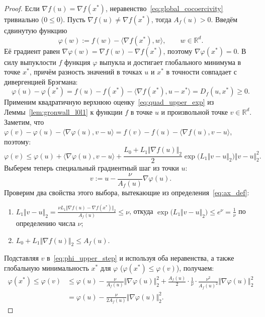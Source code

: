 \documentclass[11pt, a4paper]{article}
\theoremstyle{definition}
\begin{document}
\begin{proof}
Если $\nabla f(u) = \nabla f(x^*)$, неравенство~\eqref{eq:global_cocoercivity} тривиально ($0 \le 0$). Пусть $\nabla f(u) \neq \nabla f(x^*)$, тогда $A_f(u) > 0$. Введём сдвинутую функцию
\[
\varphi(w) := f(w) - \langle \nabla f(x^*), w \rangle, \qquad w \in \mathbb{R}^d.
\]
Её градиент равен $\nabla \varphi(w) = \nabla f(w) - \nabla f(x^*)$, поэтому $\nabla \varphi(x^*) = 0$. В силу выпуклости $f$ функция $\varphi$ выпукла и достигает глобального минимума в точке $x^*$, причём разность значений в точках $u$ и $x^*$ в точности совпадает с дивергенцией Брэгмана:
\[
\varphi(u) - \varphi(x^*) = f(u) - f(x^*) - \langle \nabla f(x^*), u - x^* \rangle = D_f(u, x^*) \ge 0.
\]
Применим квадратичную верхнюю оценку~\eqref{eq:quad_upper_exp} из Леммы~\ref{lem:gronwall_l0l1} к функции $f$ в точке $u$ и произвольной точке $v \in \mathbb{R}^d$. Заметим, что $\varphi(v) - \varphi(u) - \langle \nabla \varphi(u), v - u \rangle = f(v) - f(u) - \langle \nabla f(u), v - u \rangle$, поэтому:
\begin{equation}\label{eq:phi_upper_step}
\varphi(v) \le \varphi(u) + \langle \nabla \varphi(u), v - u \rangle + \frac{L_0 + L_1 \Vert \nabla f(u) \Vert_2}{2} \exp\big(L_1 \Vert v - u \Vert_2\big) \Vert v - u \Vert_2^2.
\end{equation}
Выберем теперь специальный градиентный шаг из точки $u$:
\[
v := u - \frac{\nu}{A_f(u)} \nabla \varphi(u).
\]
Проверим два свойства этого выбора, вытекающие из определения~\eqref{eq:ax_def}:
\begin{enumerate}
    \item $L_1 \Vert v - u \Vert_2 = \frac{\nu L_1 \Vert \nabla f(u) - \nabla f(x^*) \Vert_2}{A_f(u)} \le \nu$, откуда $\exp\big(L_1 \Vert v - u \Vert_2\big) \le e^\nu = \frac{1}{\nu}$ по определению числа $\nu$;
    \item $L_0 + L_1 \Vert \nabla f(u) \Vert_2 \le A_f(u)$.
\end{enumerate}
Подставляя $v$ в~\eqref{eq:phi_upper_step} и используя оба неравенства, а также глобальную минимальность $x^*$ для $\varphi$ ($\varphi(x^*) \le \varphi(v)$), получаем:
\begin{align*}
\varphi(x^*) \le \varphi(v) &\le \varphi(u) - \frac{\nu}{A_f(u)} \Vert \nabla \varphi(u) \Vert_2^2 + \frac{A_f(u)}{2} \cdot \frac{1}{\nu} \cdot \frac{\nu^2}{A_f(u)^2} \Vert \nabla \varphi(u) \Vert_2^2 \\
&= \varphi(u) - \frac{\nu}{2 A_f(u)} \Vert \nabla \varphi(u) \Vert_2^2.
\end{align*}

\end{proof}
\end{document}
